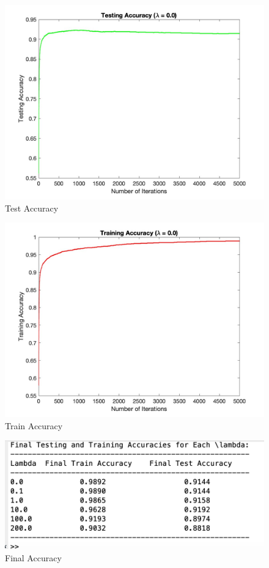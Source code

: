 \documentclass[11pt]{article}
\begin{document}
\begin{figure}[h]
    \centering
    \includegraphics[width=0.95\linewidth]{test_accuracy_lambda_0.0.jpg}
    \caption{Test Accuracy}
    \label{fig:test}
\end{figure}


\begin{figure}[h]
    \centering
    \includegraphics[width=0.95\linewidth]{train_accuracy_lambda_0.0.jpg}
    \caption{Train Accuracy}
    \label{fig:train}
\end{figure}

\begin{figure}[h]
    \centering
    \includegraphics[width=0.95\linewidth]{final_accuracy.png}
    \caption{Final Accuracy}
    \label{fig:final}
\end{figure}
\end{document}
